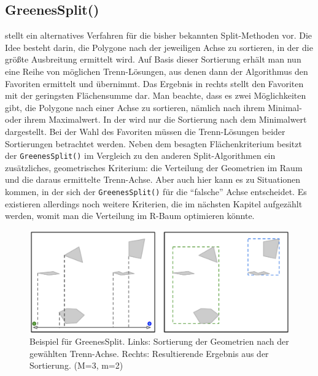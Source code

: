 \documentclass[runningheads,a4paper]{llncs}
\begin{document}
	\subsection{GreenesSplit()}
	\label{sec:grennes_split}
	\Textcite{Greene:1989} stellt ein alternatives Verfahren für die bisher bekannten Split-Methoden vor. Die Idee besteht darin, die Polygone nach der jeweiligen Achse zu sortieren, in der die größte Ausbreitung ermittelt wird. Auf Basis dieser Sortierung erhält man nun eine Reihe von möglichen Trenn-Lösungen, aus denen dann der Algorithmus den Favoriten ermittelt und übernimmt. Das Ergebnis in  rechts stellt den Favoriten mit der geringsten Flächensumme dar.
	Man beachte, dass es zwei Möglichkeiten gibt, die Polygone nach einer Achse zu sortieren, nämlich nach ihrem Minimal- oder ihrem Maximalwert. In der  wird nur die Sortierung nach dem Minimalwert dargestellt. Bei der Wahl des Favoriten müssen die Trenn-Lösungen beider Sortierungen betrachtet werden. Neben dem besagten Flächenkriterium besitzt der \texttt{GreenesSplit()} im Vergleich zu den anderen Split-Algorithmen ein zusätzliches, geometrisches Kriterium: die Verteilung der Geometrien im Raum und die daraus ermittelte Trenn-Achse. Aber auch hier kann es zu Situationen kommen, in der sich der \texttt{GreenesSplit()} für die \enquote{falsche} Achse entscheidet. Es existieren allerdings noch weitere Kriterien, die im nächsten Kapitel aufgezählt werden, womit man die Verteilung im R-Baum optimieren könnte.

	\begin{figure}[H]
		\begin{center}
		\includegraphics[width=1.0\textwidth ]{005_Beispiel_Greenes_Split.pdf}
		\caption{Beispiel für GreenesSplit. Links: Sortierung der Geometrien nach der gewählten Trenn-Achse. Rechts: Resultierende Ergebnis aus der Sortierung. (\acs{M}=3, \acs{m}=2)}
		\label{fig:beispiel-greenes-split}
		\end{center}
	\end{figure}
\end{document}
